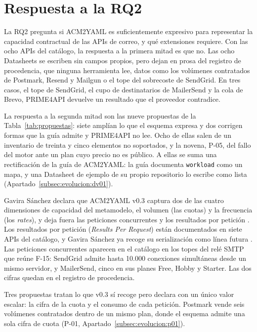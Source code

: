 \section{Respuesta a la RQ2}\label{sec:esquema:respuesta}\label{sec:evolucion:respuesta}

La RQ2 pregunta si ACM2YAML es suficientemente expresivo para representar la capacidad contractual de las APIs de correo, y qué extensiones requiere.
Con las ocho APIs del catálogo, la respuesta a la primera mitad es que no.
Las ocho Datasheets se escriben sin campos propios, pero dejan en prosa del registro de procedencia, que ninguna herramienta lee, datos como los volúmenes contratados de Postmark, Resend y Mailgun o el tope del sobrecoste de SendGrid.
En tres casos, el tope de SendGrid, el cupo de destinatarios de MailerSend y la cola de Brevo, PRIME4API devuelve un resultado que el proveedor contradice.

La respuesta a la segunda mitad son las nueve propuestas de la Tabla~\ref{tab:propuestas}: siete amplían lo que el esquema expresa y dos corrigen formas que la guía admite y PRIME4API no lee.
Ocho de ellas salen de un inventario de treinta y cinco elementos no soportados, y la novena, P-05, del fallo del motor ante un plan cuyo precio no es público.
A ellas se suma una rectificación de la guía de ACM2YAML: la guía documenta \texttt{workload} como un mapa, y una Datasheet de ejemplo de su propio repositorio lo escribe como lista (Apartado~\ref{subsec:evolucion:dv01}).

Gavira Sánchez declara que ACM2YAML v0.3 captura dos de las cuatro dimensiones de capacidad del metamodelo, el volumen (las cuotas) y la frecuencia (los \textit{rates}), y deja fuera las peticiones concurrentes y los resultados por petición \citep{gavira2026tfm}.
Los resultados por petición (\textit{Results Per Request}) están documentados en siete APIs del catálogo, y Gavira Sánchez ya recoge su serialización como línea futura \citep{gavira2026tfm}.
Las peticiones concurrentes aparecen en el catálogo en los topes del relé SMTP que reúne F-15: SendGrid admite hasta 10.000 conexiones simultáneas desde un mismo servidor, y MailerSend, cinco en sus planes Free, Hobby y Starter.
Las dos cifras quedan en el registro de procedencia.

Tres propuestas tratan lo que v0.3 sí recoge pero declara con un único valor escalar: la cifra de la cuota y el consumo de cada petición.
Postmark vende seis volúmenes contratados dentro de un mismo plan, donde el esquema admite una sola cifra de cuota (P-01, Apartado~\ref{subsec:evolucion:p01}).

